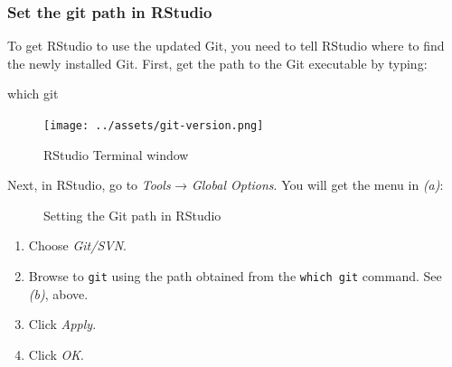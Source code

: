 \documentclass[
  letterpaper,
  DIV=11,
  numbers=noendperiod]{scrreprt}
\newenvironment{Shaded}{\begin{snugshade}}{\end{snugshade}}
\newcommand{\BuiltInTok}[1]{\textcolor[rgb]{0.00,0.23,0.31}{#1}}
\newcommand{\NormalTok}[1]{\textcolor[rgb]{0.00,0.23,0.31}{#1}}
\providecommand{\tightlist}{%
  \setlength{\itemsep}{0pt}\setlength{\parskip}{0pt}}\usepackage{longtable,booktabs,array}
\begin{document}
\subsubsection{Set the git path in
RStudio}\label{set-the-git-path-in-rstudio}

To get RStudio to use the updated Git, you need to tell RStudio where to
find the newly installed Git. First, get the path to the Git executable
by typing:

\begin{Shaded}
\begin{Highlighting}[]
\BuiltInTok{which}\NormalTok{ git}
\end{Highlighting}
\end{Shaded}

\begin{figure}[H]

{\centering \texttt{[image: ../assets/git-version.png]}

}

\caption{RStudio Terminal window}

\end{figure}%

Next, in RStudio, go to \emph{Tools} → \emph{Global Options}. You will
get the menu in \emph{(a)}:

\begin{figure}

\begin{minipage}{0.50\linewidth}



\end{minipage}%
%
\begin{minipage}{0.50\linewidth}



\end{minipage}%

\caption{\label{fig-git}Setting the Git path in RStudio}

\end{figure}%

\begin{enumerate}
\def\labelenumi{\arabic{enumi}.}
\tightlist
\item
  Choose \emph{Git/SVN}.
\item
  Browse to \texttt{git} using the path obtained from the
  \texttt{which\ git} command. See \emph{(b)}, above.
\item
  Click \emph{Apply}.
\item
  Click \emph{OK}.
\end{enumerate}
\end{document}
